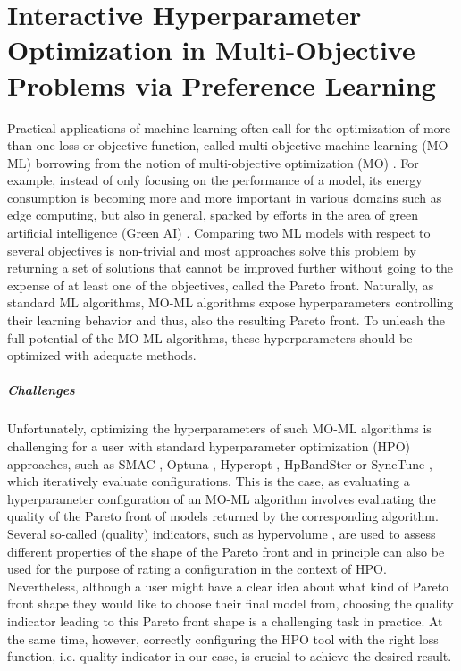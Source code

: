 \chapter{Interactive Hyperparameter Optimization in Multi-Objective Problems via Preference Learning}
\label{human-centric-chap:moo}

Practical applications of machine learning often call for the optimization of more than one loss or objective function, called multi-objective machine learning (MO-ML) \cite{jin-momlbook06a} borrowing from the notion of multi-objective optimization (MO) \cite{deb-ds16,gunantara-ce18}.
For example, instead of only focusing on the performance of a model, its energy consumption is becoming more and more important in various domains such as edge computing, but also in general, sparked by efforts in the area of green artificial intelligence (Green AI) \cite{schwartz-arxiv19a,wynsberghe-aiethics21a}.
Comparing two ML models with respect to several objectives is non-trivial and most approaches solve this problem by returning a set of solutions that cannot be improved further without going to the expense of at least one of the objectives, called the Pareto front.
Naturally, as standard ML algorithms, MO-ML algorithms expose hyperparameters controlling their learning behavior and thus, also the resulting Pareto front.
To unleash the full potential of the MO-ML algorithms, these hyperparameters should be optimized with adequate methods.

\paragraph{Challenges} Unfortunately, optimizing the hyperparameters of such MO-ML algorithms is challenging for a user with standard hyperparameter optimization (HPO) \cite{feurer-automlbook19a,bischl-dmkd23a} approaches, such as SMAC \cite{hutter-lion11a,lindauer-jmlr22a}, Optuna \cite{akiba-kdd19a}, Hyperopt \cite{komer-scipy14a}, HpBandSter \cite{falkner-icml18a} or SyneTune \cite{salinas-automl22}, which iteratively evaluate configurations.
This is the case, as evaluating a hyperparameter configuration of an MO-ML algorithm involves evaluating the quality of the Pareto front of models returned by the corresponding algorithm.
Several so-called (quality) indicators, such as hypervolume \cite{zitzler1999multiobjective}, are used to assess different properties of the shape of the Pareto front and in principle can also be used for the purpose of rating a configuration in the context of HPO.
Nevertheless, although a user might have a clear idea about what kind of Pareto front shape they would like to choose their final model from, choosing the quality indicator leading to this Pareto front shape is a challenging task in practice. At the same time, however, correctly configuring the HPO tool with the right loss function, i.e. quality indicator in our case, is crucial to achieve the desired result.

